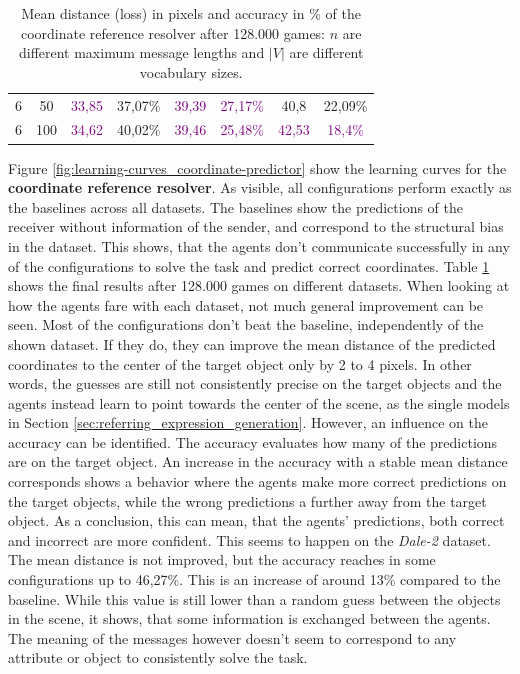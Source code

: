 \begin{table}[ht]
\begin{tabular}{cc|cc|cc|cc}
        {6}                           & {50}    & \textcolor{purple}{33,85}           & {37,07\%}                           & \textcolor{purple}{39,39}                & \textcolor{purple}{27,17\%} & {40,8}                    & {22,09\%}                   \\
        {6}                           & {100}   & \textcolor{purple}{34,62}           & {40,02\%}                           & \textcolor{purple}{39,46}                & \textcolor{purple}{25,48\%} & \textcolor{purple}{42,53} & \textcolor{purple}{18,4\%}  \\
        \bottomrule
    \end{tabular}
    \caption{Mean distance (loss) in pixels and accuracy in \% of the coordinate reference resolver after 128.000 games: $n$ are different maximum message lengths and $|V|$ are different vocabulary sizes.}
    \label{tab:results:coordinate-reference-resolver-game}
\end{table}

Figure \ref{fig:learning-curves_coordinate-predictor} show the learning curves for the \textbf{coordinate reference resolver}.
As visible, all configurations perform exactly as the baselines across all datasets.
The baselines show the predictions of the receiver without information of the sender, and correspond to the structural bias in the dataset.
This shows, that the agents don't communicate successfully in any of the configurations to solve the task and predict correct coordinates.
Table \ref{tab:results:coordinate-reference-resolver-game} shows the final results after 128.000 games on different datasets.
When looking at how the agents fare with each dataset, not much general improvement can be seen.
Most of the configurations don't beat the baseline, independently of the shown dataset.
If they do, they can improve the mean distance of the predicted coordinates to the center of the target object only by 2 to 4 pixels.
In other words, the guesses are still not consistently precise on the target objects and the agents instead learn to point towards the center of the scene, as the single models in Section \ref{sec:referring_expression_generation}.
However, an influence on the accuracy can be identified.
The accuracy evaluates how many of the predictions are on the target object.
An increase in the accuracy with a stable mean distance corresponds shows a behavior where the agents make more correct predictions on the target objects, while the wrong predictions a further away from the target object.
As a conclusion, this can mean, that the agents' predictions, both correct and incorrect are more confident.
This seems to happen on the \emph{Dale-2} dataset.
The mean distance is not improved, but the accuracy reaches in some configurations up to 46,27\%.
This is an increase of around 13\% compared to the baseline.
While this value is still lower than a random guess between the objects in the scene, it shows, that some information is exchanged between the agents.
The meaning of the messages however doesn't seem to correspond to any attribute or object to consistently solve the task.

